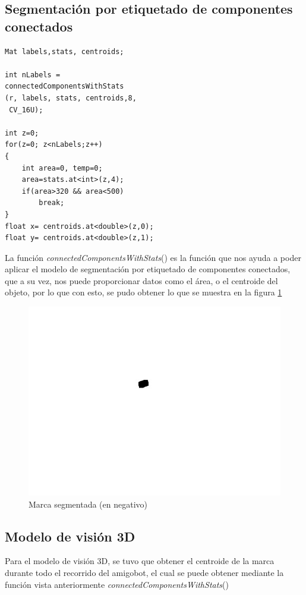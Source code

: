 \documentclass[spanish,10pt,letterpaper, twocolumn]{article}
\begin{document}
\subsection{Segmentaci\'on por etiquetado de componentes conectados}

\lstset{language=C++}
\begin{lstlisting}[frame=single]
Mat labels,stats, centroids;

int nLabels = 
connectedComponentsWithStats
(r, labels, stats, centroids,8,
 CV_16U);
	
int z=0;
for(z=0; z<nLabels;z++)
{
	int area=0, temp=0;
	area=stats.at<int>(z,4);
	if(area>320 && area<500) 
		break;
}
float x= centroids.at<double>(z,0);
float y= centroids.at<double>(z,1);
\end{lstlisting}

La funci\'on \textit{connectedComponentsWithStats}() es la funci\'on que nos ayuda a poder aplicar el modelo de segmentaci\'on por etiquetado de componentes conectados, que a su vez, nos puede proporcionar datos como el \'area, o el centroide del objeto, por lo que con esto, se pudo obtener lo que se muestra en la figura \ref{vision:fig6} 

\begin{figure}[ht]
	\centering
	\includegraphics[scale=0.16]{labels150.jpg}
	\caption{Marca segmentada (en negativo)}
	\label{vision:fig6}
\end{figure}




\subsection{Modelo de visi\'on 3D}
Para el modelo de visi\'on 3D, se tuvo que obtener el centroide de la marca durante todo el recorrido del amigobot, el cual se puede obtener mediante la funci\'on vista anteriormente  \textit{connectedComponentsWithStats}()
\end{document}
